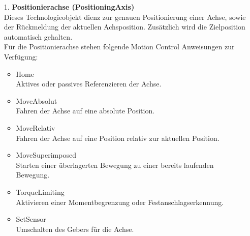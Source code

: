     \begin{itemize}

        \item[1.] \textbf{Positionierachse (PositioningAxis)} \\
            Dieses Technologieobjekt dienz zur genauen Positionierung einer Achse, sowie der Rückmeldung der aktuellen Achsposition. Zusätzlich wird die Zielposition automatisch gehalten. \\
            Für die Positionierachse stehen folgende Motion Control Anweisungen zur Verfügung: 
            \begin{itemize}
                \item Home \\
                    Aktives oder passives Referenzieren der Achse.
                \item MoveAbsolut \\
                    Fahren der Achse auf eine absolute Position.
                \item MoveRelativ \\
                    Fahren der Achse auf eine Position relativ zur aktuellen Position.
                \item MoveSuperimposed \\
                    Starten einer überlagerten Bewegung zu einer bereits laufenden Bewegung.
                \item TorqueLimiting \\
                    Aktivieren einer Momentbegrenzung oder Festanschlagserkennung.
                \item SetSensor \\
                    Umschalten des Gebers für die Achse. 
                    \cite{Technologieobjekte}
            \end{itemize}
            


\end{itemize}
